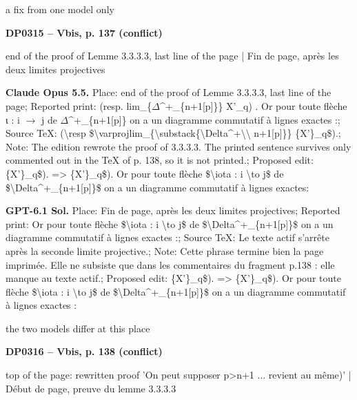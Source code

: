 a fix from one model only\par
\par\noindent\hypertarget{DP0315}{}\textbf{DP0315 -- Vbis, p. 137 (conflict)}\par
end of the proof of Lemme 3.3.3.3, last line of the page | Fin de page, après les deux limites projectives\par
\textbf{Claude Opus 5.5.} Place: end of the proof of Lemme 3.3.3.3, last line of the page; Reported print: (resp. lim\_\{\ensuremath{\Delta}\textasciicircum{}+\_\{n+1[p]\}\} X'\_q) . Or pour toute flèche ι : i \ensuremath{\longrightarrow} j de \ensuremath{\Delta}\textasciicircum{}+\_\{n+1[p]\} on a un diagramme commutatif à lignes exactes :; Source TeX: (\textbackslash{}resp \$\textbackslash{}varprojlim\_\{\textbackslash{}substack\{\textbackslash{}Delta\textasciicircum{}+\textbackslash{}\textbackslash{} n+1[p]\}\} \{X'\}\_q\$).; Note: The edition rewrote the proof of 3.3.3.3. The printed sentence survives only commented out in the TeX of p. 138, so it is not printed.; Proposed edit: \{X'\}\_q\$). =\allowbreak > \{X'\}\_q\$). Or pour toute flèche \$\textbackslash{}iota : i \textbackslash{}to j\$ de \$\textbackslash{}Delta\textasciicircum{}+\_\{n+1[p]\}\$ on a un diagramme commutatif à lignes exactes:\par
\textbf{GPT-6.1 Sol.} Place: Fin de page, après les deux limites projectives; Reported print: Or pour toute flèche \$\textbackslash{}iota : i \textbackslash{}to j\$ de \$\textbackslash{}Delta\textasciicircum{}+\_\{n+1[p]\}\$ on a un diagramme commutatif à lignes exactes :; Source TeX: Le texte actif s'arrête après la seconde limite projective.; Note: Cette phrase termine bien la page imprimée. Elle ne subsiste que dans les commentaires du fragment p.138 : elle manque au texte actif.; Proposed edit: \{X'\}\_q\$). =\allowbreak > \{X'\}\_q\$). Or pour toute flèche \$\textbackslash{}iota : i \textbackslash{}to j\$ de \$\textbackslash{}Delta\textasciicircum{}+\_\{n+1[p]\}\$ on a un diagramme commutatif à lignes exactes :\par
the two models differ at this place\par
\par\noindent\hypertarget{DP0316}{}\textbf{DP0316 -- Vbis, p. 138 (conflict)}\par
top of the page: rewritten proof 'On peut supposer p>n+1 ... revient au même)' | Début de page, preuve du lemme 3.3.3.3\par
